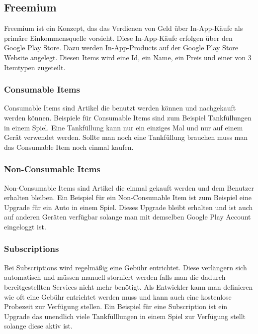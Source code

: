 \documentclass[FIPLY_base.tex]{subfiles}
\author{Andreas Denkmayr}
\date{25. Februar 2016}
\begin{document}
\subsection{Freemium}
Freemium ist ein Konzept, das das Verdienen von Geld über In-App-Käufe als primäre Einkommensquelle vorsieht.
Diese In-App-Käufe erfolgen über den Google Play Store. 
Dazu werden In-App-Products auf der Google Play Store Website angelegt.
Diesen Items wird eine Id, ein Name, ein Preis und einer von 3 Itemtypen zugeteilt. 

\subsubsection{Consumable Items}
Consumable Items sind Artikel die benutzt werden können und nachgekauft werden können. 
Beispiele für Consumable Items sind zum Beispiel Tankfüllungen in einem Spiel.
Eine Tankfüllung kann nur ein einziges Mal und nur auf einem Gerät verwendet werden. Sollte man noch eine Tankfüllung brauchen muss man das Consumable Item noch einmal kaufen. 

\subsubsection{Non-Consumable Items} 
Non-Consumable Items sind Artikel die einmal gekauft werden und dem Benutzer erhalten bleiben.
Ein Beispiel für ein Non-Consumable Item ist zum Beispiel eine Upgrade für ein Auto in einem Spiel.
Dieses Upgrade bleibt erhalten und ist auch auf anderen Geräten verfügbar solange man mit demselben Google Play Account eingeloggt ist. 

\subsubsection{Subscriptions}
Bei Subscriptions wird regelmäßig eine Gebühr entrichtet.
Diese verlängern sich automatisch und müssen manuell storniert werden falls man die dadurch bereitgestellten Services nicht mehr benötigt.
Als Entwickler kann man definieren wie oft eine Gebühr entrichtet werden muss und kann auch eine kostenlose Probezeit zur Verfügung stellen. 
Ein Beispiel für eine Subscription ist ein Upgrade das unendlich viele Tankfülllungen in einem Spiel zur Verfügung stellt solange diese aktiv ist.
\end{document}
